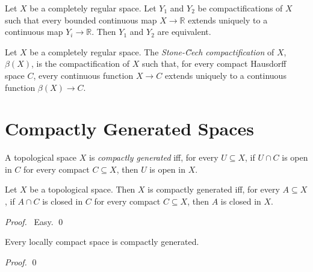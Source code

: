 \begin{cor}
Let $X$ be a completely regular space. Let $Y_1$ and $Y_2$ be compactifications of $X$ such that every bounded continuous map $X \rightarrow \mathbb{R}$
extends uniquely to a continuous map $Y_i \rightarrow \mathbb{R}$. Then $Y_1$ and $Y_2$ are equivalent.
\end{cor}

\begin{df}
Let $X$ be a completely regular space. The \emph{Stone-\u{C}ech compactification} of $X$, $\beta(X)$, is the compactification of $X$ such that, for every compact Hausdorff space $C$,
every continuous function $X \rightarrow C$ extends uniquely to a continuous function $\beta(X) \rightarrow C$.
\end{df}

\section{Compactly Generated Spaces}

\begin{df}
  A topological space $X$ is \emph{compactly generated} iff, for every $U \subseteq X$, if $U \cap C$ is open in $C$ for every compact $C \subseteq X$, then $U$ is open in $X$.
\end{df}

\begin{lm}
  Let $X$ be a topological space. Then $X$ is compactly generated iff, for every $A \subseteq X$, if $A \cap C$ is closed in $C$ for every compact $C \subseteq X$, then $A$ is closed in $X$.
\end{lm}

\begin{proof}
  \pf\ Easy. \qed
\end{proof}

\begin{prop}
  Every locally compact space is compactly generated.
\end{prop}

\begin{proof}
  \pf
  \qed
\end{proof}

